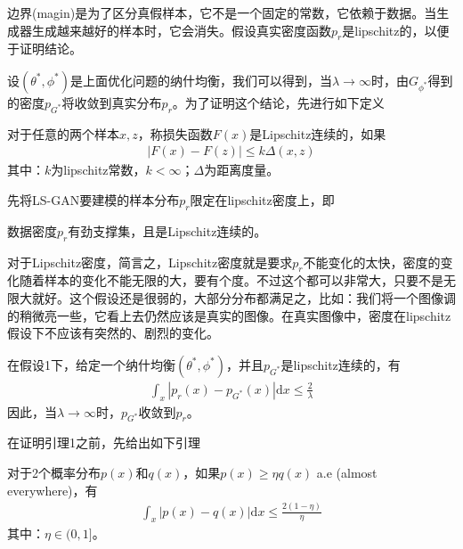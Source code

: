             边界(magin)是为了区分真假样本，它不是一个固定的常数，它依赖于数据。当生成器生成越来越好的样本时，它会消失。假设真实密度函数$p_r$是lipschitz的，以便于证明结论。
            \par
            设$(\theta^*,\phi^*)$是上面优化问题的纳什均衡，我们可以得到，当$\lambda\to \infty$时，由$G_{\phi^*}$得到的密度$p_{G^*}$将收敛到真实分布$p_r$。为了证明这个结论，先进行如下定义
            \begin{definition}[Lipschitz 函数]
            对于任意的两个样本$x,z$，称损失函数$F(x)$是Lipschitz连续的，如果
            \begin{align*}
            |F(x) - F(z)| \leqslant k \Delta(x,z)
            \end{align*}
            其中：$k$为lipschitz常数，$k<\infty$；$\Delta$为距离度量。
            \end{definition}
            \par
            先将LS-GAN要建模的样本分布$p_r$限定在lipschitz密度上，即
            \begin{Assumption}[1]
            数据密度$p_r$有劲支撑集，且是Lipschitz连续的。
            \end{Assumption}
            \par
            对于Lipschitz密度，简言之，Lipschitz密度就是要求$p_r$不能变化的太快，密度的变化随着样本的变化不能无限的大，要有个度。不过这个都可以非常大，只要不是无限大就好。这个假设还是很弱的，大部分分布都满足之，比如：我们将一个图像调的稍微亮一些，它看上去仍然应该是真实的图像。在真实图像中，密度在lipschitz假设下不应该有突然的、剧烈的变化。
            \begin{lemma}[1]
            在假设1下，给定一个纳什均衡$(\theta^*,\phi^*)$，并且$p_{G^*}$是lipschitz连续的，有
            \begin{align*}
            \int_x|p_r(x) - p_{G^*}(x)|\mathrm{d}x \leqslant \frac{2}{\lambda}
            \end{align*}
            因此，当$\lambda\to \infty$时，$p_{G^*}$收敛到$p_r$。
            \end{lemma}
            \par
            在证明引理1之前，先给出如下引理
            \begin{lemma}[4]
            对于2个概率分布$p(x)$和$q(x)$，如果$p(x) \geqslant \eta q(x)$ a.e (almost everywhere)，有
            \begin{align*}
            \int_x|p(x) - q(x)|\mathrm{d}x \leqslant \frac{2(1-\eta)}{\eta}
            \end{align*}
            其中：$\eta\in (0,1]$。
            \end{lemma}
